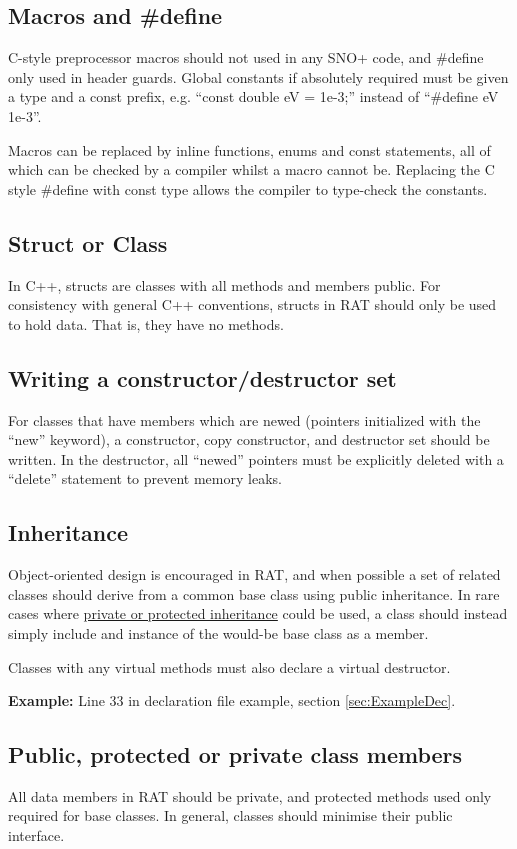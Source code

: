 \documentclass[11pt]{article}
\begin{document}
\subsection{Macros and \#define}
C-style preprocessor macros should not used in any SNO+ code, and \#define only used in header guards. Global constants if absolutely required must be given a type and a const prefix, e.g. ``const double eV = 1e-3;'' instead of ``\#define eV 1e-3''.

Macros can be replaced by inline functions, enums and const statements, all of which can be checked by a compiler whilst a macro cannot be. Replacing the C style \#define with const type allows the compiler to type-check the constants.

\subsection{Struct or Class}
In C++, structs are classes with all methods and members public. For consistency with general C++ conventions, structs in RAT should only be used to hold data. That is, they have no methods.

\subsection{Writing a constructor/destructor set}
For classes that have members which are newed (pointers initialized with the ``new'' keyword), a constructor, copy constructor, and destructor set should be written. In the destructor, all ``newed'' pointers must be explicitly deleted with a ``delete'' statement to prevent memory leaks.

\subsection{Inheritance}
Object-oriented design is encouraged in RAT, and when possible a set of related classes should derive from a common base class using public inheritance. In rare cases where \href{http://www.parashift.com/c++-faq-lite/private-inheritance.html}{private or protected inheritance} could be used, a class should instead simply include and instance of the would-be base class as a member.

Classes with any virtual methods must also declare a virtual destructor.

{\bf Example:} Line 33 in declaration file example, section \ref{sec:ExampleDec}.

\subsection{Public, protected or private class members}
All data members in RAT should be private, and protected methods used only required for base classes. In general, classes should minimise their public interface.
\end{document}
